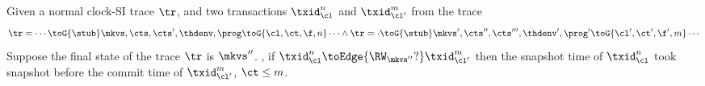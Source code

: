 \begin{lemma}[\( \RW_\mkvs \)]
    \label{lem:clock-si-rw}
    Given a normal clock-SI trace \( \tr \), and two transactions \( \txid_\cl^n \) and \( \txid_{\cl'}^m \) from the trace
    \[
        \begin{array}{@{}l@{}}
            \tr = \cdots \toG{\stub} \mkvs,\cts,\cts',\thdenv, \prog \toG{\cl,\ct,\f,n} \cdots \land 
            \tr = \cdot \toG{\stub} \mkvs',\cts'',\cts''',\thdenv', \prog' \toG{\cl',\ct',\f',m} \cdots
        \end{array}
    \]
    Suppose the final state of the trace \( \tr \) is \( \mkvs'' \).
    , if \( \txid_\cl^n \toEdge{\RW_{\mkvs''}?} \txid_{\cl'}^m \) then the snapshot time of \( \txid_{\cl}^n \) took snapshot before the commit time of \( \txid_{\cl'}^m \), \ie \( \ct \leq m \).
\end{lemma}
